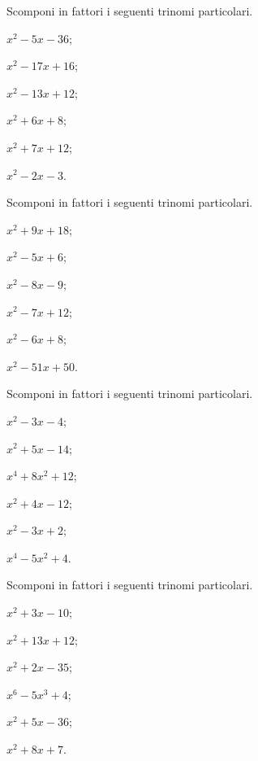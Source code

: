 \begin{esercizio}
 \label{ese:13.70}
 Scomponi in fattori i seguenti trinomi particolari.
 \begin{multicols}{3}
 \begin{enumeratea}
 \item $x^{2}-5x-36$;
 \item $x^{2}-17x+16$;
 \item $x^{2}-13x+12$;
 \item $x^{2}+6x+8$;
 \item $x^{2}+7x+12$;
 \item $x^{2}-2x-3$.
 \end{enumeratea}
\end{multicols}
\end{esercizio}

\begin{esercizio}
 \label{ese:13.71}
 Scomponi in fattori i seguenti trinomi particolari.
 \begin{multicols}{3}
 \begin{enumeratea}
 \item $x^{2}+9x+18$;
 \item $x^{2}-5x+6$;
 \item $x^{2}-8x-9$;
 \item $x^{2}-7x+12$;
 \item $x^{2}-6x+8$;
 \item $x^{2}-51x+50$.
 \end{enumeratea}
\end{multicols}
\end{esercizio}

\begin{esercizio}
 \label{ese:13.72}
 Scomponi in fattori i seguenti trinomi particolari.
 \begin{multicols}{3}
 \begin{enumeratea}
 \item $x^{2}-3x-4$;
 \item $x^{2}+5x-14$;
 \item $x^{4}+8x^{2}+12$;
 \item $x^{2}+4x-12$;
 \item $x^{2}-3x+2$;
 \item $x^{4}-5x^{2}+4$.
 \end{enumeratea}
\end{multicols}
\end{esercizio}

\begin{esercizio}
 \label{ese:13.73}
 Scomponi in fattori i seguenti trinomi particolari.
 \begin{multicols}{3}
 \begin{enumeratea}
 \item $x^{2}+3x-10$;
 \item $x^{2}+13x+12$;
 \item $x^{2}+2x-35$;
 \item $x^{6}-5x^{3}+4$;
 \item $x^{2}+5x-36$;
 \item $x^{2}+8x+7$.
 \end{enumeratea}
\end{multicols}
\end{esercizio}


